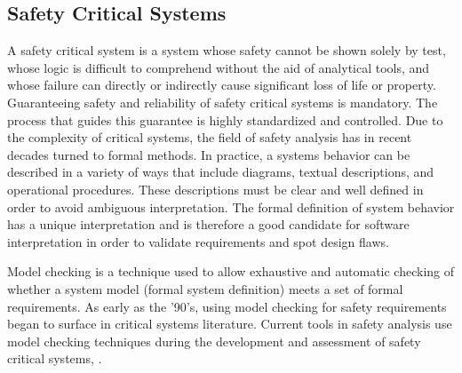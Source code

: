 \subsection{Safety Critical Systems}
\label{sec:SA_background}
A safety critical system is a system whose safety cannot be shown solely by test, whose logic is difficult to comprehend without the aid of analytical tools, and whose failure can directly or indirectly cause significant loss of life or property\cite{SAE:ARP4761}. Guaranteeing safety and reliability of safety critical systems is mandatory. The process that guides this guarantee is highly standardized and controlled. Due to the complexity of critical systems, the field of safety analysis has in recent decades turned to formal methods. In practice, a systems behavior can be described in a variety of ways that include diagrams, textual descriptions, and operational procedures. These descriptions must be clear and well defined in order to avoid ambiguous interpretation. The formal definition of system behavior has a unique interpretation and is therefore a good candidate for software interpretation in order to validate requirements and spot design flaws. 

Model checking is a technique used to allow exhaustive and automatic checking of whether a system model (formal system definition) meets a set of formal requirements. As early as the '90's, using model checking for safety requirements began to surface in critical systems literature\cite{10.1007/3-540-61772-8_46,DBLP:conf/safecomp/CimattiGMRTT98,DBLP:conf/edcc/BernardeschiFGM96}. Current tools in safety analysis use model checking techniques during the development and assessment of safety critical systems, \cite{MattareiThesis,info17:HaLuHo,CAV2015:BoCiGrMa,symbAltaRica,DBLP:conf/tacas/BittnerBCCGGMMZ16}.






